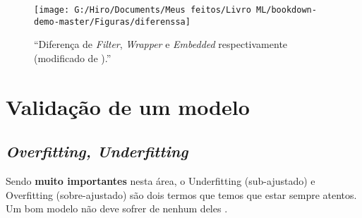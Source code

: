 \documentclass[
]{book}
\begin{document}
\begin{figure}

{\centering \texttt{[image: G:/Hiro/Documents/Meus feitos/Livro ML/bookdown-demo-master/Figuras/diferenssa]} 

}

\caption{``Diferença de \emph{Filter}, \emph{Wrapper} e \emph{Embedded} respectivamente (modificado de \citet{covoes2010seleccao}).''}\label{fig:diferenssa}
\end{figure}



\hypertarget{valid}{%
\chapter{Validação de um modelo}\label{valid}}

\hypertarget{fitt}{%
\section{\texorpdfstring{\emph{Overfitting, Underfitting}}{Overfitting, Underfitting}}\label{fitt}}

Sendo \textbf{muito importantes} nesta área, o Underfitting (sub-ajustado) e Overfitting (sobre-ajustado) são dois termos que temos que estar sempre atentos. Um bom modelo não deve sofrer de nenhum deles \citep{silver2013sinal}.
\end{document}
